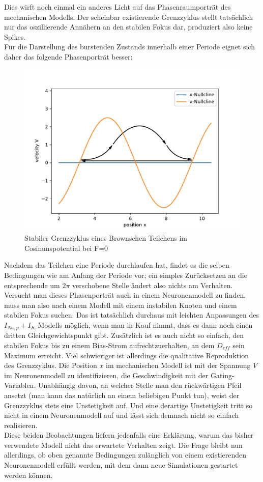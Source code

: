 \documentclass[12pt,a4paper]{article}
\begin{document}
Dies wirft noch einmal ein anderes Licht auf das Phasenraumporträt des mechanischen Modells. Der scheinbar existierende Grenzzyklus stellt tatsächlich nur das oszillierende Annähern an den stabilen Fokus dar, produziert also keine Spikes.\\
Für die Darstellung des burstenden Zustands innerhalb einer Periode eignet sich daher das folgende Phasenporträt besser:
\begin{figure}[H]
	\centering
	\includegraphics[scale=0.9]{nullclinemm3.pdf} 
	\caption{Stabiler Grenzzyklus eines Brownschen Teilchens im Cosinunspotential bei F=0}
	\label{miso2}
\end{figure} 
Nachdem das Teilchen eine Periode durchlaufen hat, findet es die selben Bedingungen wie am Anfang der Periode vor; ein simples Zurücksetzen an die entsprechende um $2\pi$ verschobene Stelle ändert also nichts am Verhalten.\\
Versucht man dieses Phasenporträt auch in einem Neuronenmodell zu finden, muss man also nach einem Modell mit einem instabilen Knoten und einem stabilen Fokus suchen. Das ist tatsächlich durchaus mit leichten Anpassungen des $I_{Na,p}+I_K$-Modells möglich, wenn man in Kauf nimmt, dass es dann noch einen dritten Gleichgewichtspunkt gibt. Zusätzlich ist es auch nicht so einfach, den stabilen Fokus bis zu einem Bias-Strom aufrechtzuerhalten, an dem $D_{eff}$ sein Maximum erreicht. Viel schwieriger ist allerdings die qualitative Reproduktion des Grenzzyklus. Die Position $x$ im mechanischen Modell ist mit der Spannung $V$ im Neuronenmodell zu identifizieren, die Geschwindigkeit mit der Gating-Variablen. Unabhängig davon, an welcher Stelle man den rückwärtigen Pfeil ansetzt (man kann das natürlich an einem beliebigen Punkt tun), weist der Grenzzyklus stets eine Unstetigkeit auf. Und eine derartige Unstetigkeit tritt so nicht in einem Neuronenmodell auf und lässt sich demnach nicht so einfach realisieren. \\
Diese beiden Beobachtungen liefern jedenfalls eine Erklärung, warum das bisher verwendete Modell nicht das erwartete Verhalten zeigt. Die Frage bleibt nun allerdings, ob oben genannte Bedingungen zulänglich von einem existierenden Neuronenmodell erfüllt werden, mit dem dann neue Simulationen gestartet werden können.
\end{document}
